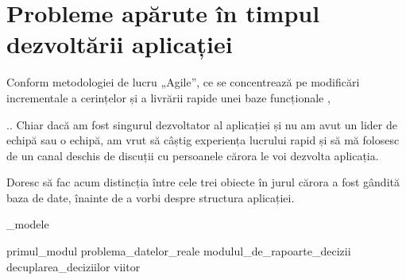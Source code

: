 \chapter{Probleme apărute în timpul dezvoltării aplicației}

	Conform metodologiei de lucru „Agile”, ce se concentrează pe modificări incrementale a cerințelor și a livrării rapide unei baze funcționale \cite{agile},

	.. Chiar dacă am fost singurul dezvoltator al aplicației și nu am avut un lider de echipă sau o echipă, am vrut să câștig experiența lucrului rapid și să mă folosesc de un canal deschis de discuții cu persoanele cărora le voi dezvolta aplicația.

	Doresc să fac acum distincția între cele trei obiecte în jurul cărora a fost gândită baza de date, înainte de a vorbi despre structura aplicației.

	{_modele}

	{primul_modul}
	{problema_datelor_reale}
	{modulul_de_rapoarte_decizii}
	{decuplarea_deciziilor}
	{viitor}
